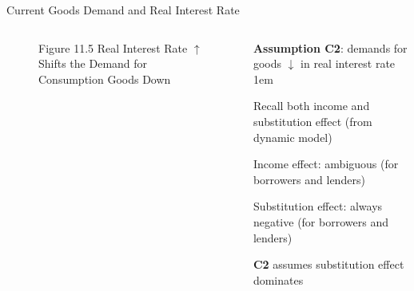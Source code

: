 \documentclass[11pt,aspectratio=43]{beamer}
\let\olditemize=\itemize
\let\endolditemize=\enditemize
\renewenvironment{itemize}{\olditemize \itemsep1em}{\endolditemize}
\theoremstyle{definition}
\begin{document}
\begin{frame}{Current Goods Demand and Real Interest Rate}
\label{slide:Current_Goods_Demand_and_Real_Interest_Rate}
    \begin{columns}
        \begin{column}{0.5\textwidth}
            \begin{figure}
                \caption{\scriptsize Figure 11.5  Real Interest Rate $ \uparrow  $ Shifts the Demand for Consumption Goods Down}
            \end{figure}
        \end{column}
        \begin{column}{0.5\textwidth}
            \textbf{Assumption C2}: demands for goods $ \downarrow  $ in real interest rate
            \begin{itemize}
                \item Recall both \alert{income and substitution effect} (from dynamic model)
                \item Income effect: ambiguous (for borrowers and lenders)
                \item Substitution effect: always negative (for borrowers and lenders)
                \item \textbf{C2} assumes substitution effect dominates
            \end{itemize}
        \end{column}
    \end{columns}
\end{frame}
\end{document}
